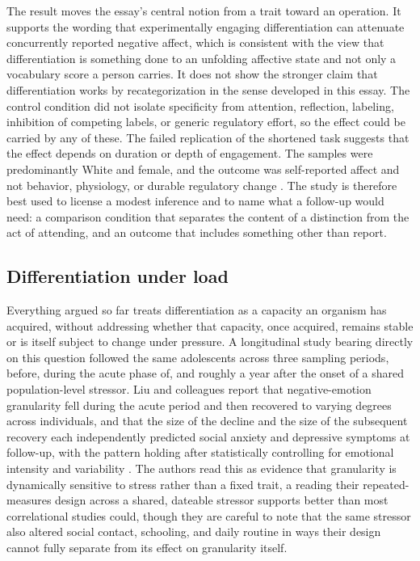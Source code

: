 \documentclass[11pt]{article}
\begin{document}
The result moves the essay's central notion from a trait toward an operation. It supports the wording that experimentally engaging differentiation can attenuate concurrently reported negative affect, which is consistent with the view that differentiation is something done to an unfolding affective state and not only a vocabulary score a person carries. It does not show the stronger claim that differentiation works by recategorization in the sense developed in this essay. The control condition did not isolate specificity from attention, reflection, labeling, inhibition of competing labels, or generic regulatory effort, so the effect could be carried by any of these. The failed replication of the shortened task suggests that the effect depends on duration or depth of engagement. The samples were predominantly White and female, and the outcome was self-reported affect and not behavior, physiology, or durable regulatory change \citep{CarolusStarr2026}. The study is therefore best used to license a modest inference and to name what a follow-up would need: a comparison condition that separates the content of a distinction from the act of attending, and an outcome that includes something other than report.

\subsection{Differentiation under load}\label{sub:load}

Everything argued so far treats differentiation as a capacity an organism has acquired, without addressing whether that capacity, once acquired, remains stable or is itself subject to change under pressure. A longitudinal study bearing directly on this question followed the same adolescents across three sampling periods, before, during the acute phase of, and roughly a year after the onset of a shared population-level stressor. Liu and colleagues report that negative-emotion granularity fell during the acute period and then recovered to varying degrees across individuals, and that the size of the decline and the size of the subsequent recovery each independently predicted social anxiety and depressive symptoms at follow-up, with the pattern holding after statistically controlling for emotional intensity and variability \citep{Liu2026}. The authors read this as evidence that granularity is dynamically sensitive to stress rather than a fixed trait, a reading their repeated-measures design across a shared, dateable stressor supports better than most correlational studies could, though they are careful to note that the same stressor also altered social contact, schooling, and daily routine in ways their design cannot fully separate from its effect on granularity itself.
\end{document}
